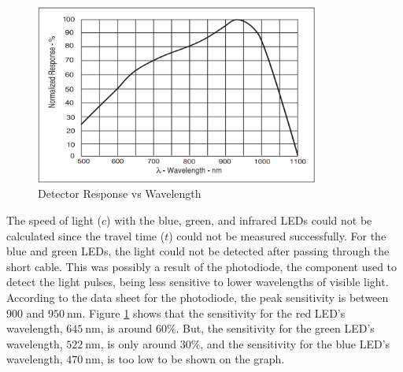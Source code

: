 \documentclass[12pt]{iopart} %
\gdef\units#1{~\mathrm{#1}}
\begin{document}
\begin{figure}[htbp]
  \begin{indented}
  \item[]\includegraphics[width=0.83\textwidth]{detector-response-vs-wavelength.png}
  \end{indented}
  \caption{\label{fig:respones_wavelength_graph}
  Detector Response vs Wavelength
  }
\end{figure}

The speed of light ($c$) with the blue, green, and infrared LEDs could not be calculated since the travel time ($t$) could not be measured successfully.
For the blue and green LEDs, the light could not be detected after passing through the short cable.
This was possibly a result of the photodiode, the component used to detect the light pulses, being less sensitive to lower wavelengths of visible light.
According to the data sheet for the photodiode, the peak sensitivity is between $900$ and $950 \units{nm}$.
Figure \ref{fig:respones_wavelength_graph} shows that the sensitivity for the red LED's wavelength, $645 \units{nm}$, is around 60\%.
But, the sensitivity for the green LED's wavelength, $522 \units{nm}$, is only around 30\%, and the sensitivity for the blue LED's wavelength, $470 \units{nm}$, is too low to be shown on the graph.
\end{document}
